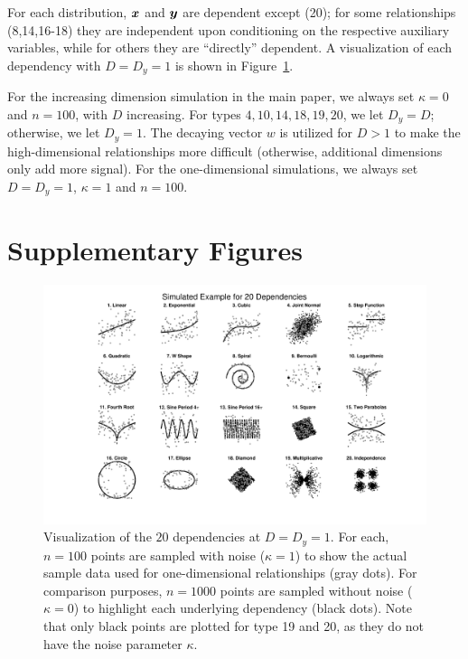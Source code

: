 \documentclass[11pt]{extarticle}
\begin{document}
For each distribution, $\boldsymbol{x}$ and $\boldsymbol{y}$ are dependent except  (20); for some relationships (8,14,16-18) they are  independent upon conditioning on the respective auxiliary variables, while for others they are
 ``directly'' dependent.
A visualization of each dependency with $D=D_y=1$ is shown in Figure~\ref{f:dependencies}.


For the increasing dimension simulation in the main paper, we always set $\kappa=0$ and $n=100$, with $D$ increasing.  For types  $4,10,14,18,19,20$, we let $D_y=D$; otherwise, we let $D_y=1$.
The decaying vector $w$ is utilized for $D>1$ to make the high-dimensional relationships more difficult (otherwise, additional dimensions only add more signal).
For the one-dimensional simulations, we always set $D=D_y=1$, $\kappa=1$ and $n=100$.

\clearpage




\clearpage
\section{Supplementary Figures}
\label{appen:figs}

\begin{figure}[htbp]
\includegraphics[trim={5cm 1.5cm 4cm 0.5cm},clip, width=1.0\textwidth]{Figures/FigSimVisual}
\caption{Visualization of the $20$ dependencies at $D=D_{y}=1$. For each, $n=100$ points are sampled with noise ($\kappa=1$) to show the actual sample data used for one-dimensional relationships (gray dots). For comparison purposes, $n=1000$ points are sampled without noise ($\kappa=0$) to highlight each underlying dependency (black dots). Note that only black points are plotted for type 19 and 20, as they do not have the noise parameter $\kappa$.
}
\label{f:dependencies}
\end{figure}
\end{document}
